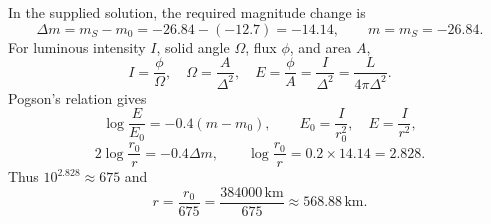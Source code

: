In the supplied solution, the required magnitude change is
\[
\Delta m=m_S-m_0=-26.84-(-12.7)=-14.14,
\qquad m=m_S=-26.84.
\]
For luminous intensity $I$, solid angle $\Omega$, flux $\phi$, and area $A$,
\[
I=\frac{\phi}{\Omega},\quad \Omega=\frac{A}{\Delta^2},\quad
E=\frac{\phi}{A}=\frac{I}{\Delta^2}=\frac{L}{4\pi\Delta^2}.
\]
Pogson's relation gives
\[
\log\frac{E}{E_0}=-0.4(m-m_0),\qquad E_0=\frac{I}{r_0^2},\quad E=\frac{I}{r^2},
\]
\[
2\log\frac{r_0}{r}=-0.4\Delta m,\qquad
\log\frac{r_0}{r}=0.2\times14.14=2.828.
\]
Thus $10^{2.828}\approx675$ and
\[
r=\frac{r_0}{675}=\frac{384000\,\mathrm{km}}{675}\approx568.88\,\mathrm{km}.
\]
